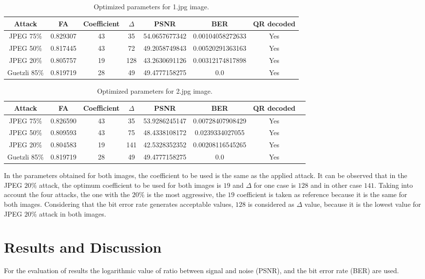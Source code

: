 \documentclass[runningheads]{llncs}
\begin{document}
\begin{table}
	\centering
	\begin{tabular}{|c|c|c|c|c|c|c|}
		\hline
		Attack & FA & Coefficient & $\Delta$ & PSNR & BER & QR decoded \\\hline
		JPEG 75\% & 0.829307 & 43 & 35 & 54.0657677342 & 0.00104058272633 & Yes \\
		JPEG 50\% & 0.817445 & 43 & 72 & 49.2058749843 & 0.00520291363163 & Yes \\
		JPEG 20\% & 0.805757 & 19 & 128 & 43.2630691126 & 0.00312174817898 & Yes \\
		Guetzli 85\% \cite{Alakuijala2017} & 0.819719 & 28 & 49 & 49.4777158275 & 0.0 & Yes \\
		\hline
	\end{tabular}
	\caption{Optimized parameters for 1.jpg image.}
\end{table}
\begin{table}
	\centering
	\begin{tabular}{|c|c|c|c|c|c|c|c|}
		\hline
		Attack & FA & Coefficient & $\Delta$ & PSNR & BER & QR decoded \\\hline
		JPEG 75\% & 0.826590 & 43 & 35 & 53.9286245147 & 0.00728407908429 & Yes \\
		JPEG 50\% & 0.809593 & 43 & 75 & 48.4338108172 & 0.0239334027055 & Yes \\
		JPEG 20\% & 0.804583 & 19 & 141 & 42.5328352352 & 0.00208116545265 & Yes \\
		Guetzli 85\% \cite{Alakuijala2017} & 0.819719 & 28 & 49 & 49.4777158275 & 0.0 & Yes \\
		\hline
	\end{tabular}
	\caption{Optimized parameters for 2.jpg image.}
\end{table}
In the parameters obtained for both images, the coefficient to be used is the same as the applied attack. It can be observed that in the JPEG $20\%$ attack, the optimum coefficient to be used for both images is $19$ and $\Delta$ for one case is $128$ and in other case $141$. Taking into account the four attacks, the one with the $20\%$ is the most aggressive, the $19$ coefficient is taken as reference because it is the same for both images. Considering that the bit error rate generates acceptable values, $128$ is considered as $\Delta$ value, because it is the lowest value for JPEG $20\%$ attack in both images.                      

\section{Results and Discussion}
For the evaluation of results the logarithmic value of ratio between signal and noise (PSNR), and the bit error rate (BER) are used.
\end{document}
